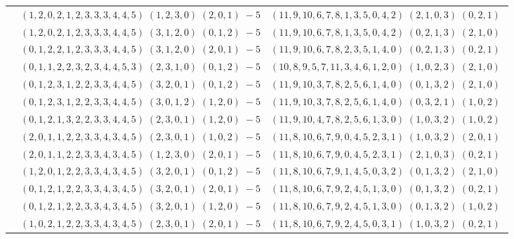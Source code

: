 \documentclass[11pt]{article}
\begin{document}
\begin{longtable}[l]{|c|c|c|}
 \cline{2-3} 
 & $(1 ,2 ,0 ,2 ,1 ,2 ,3 ,3 ,3 ,4 ,4 ,5) \;(1 ,2 ,3 ,0) \;(2 ,0 ,1) \;-5$ & $(11 ,9 ,10 ,6 ,7 ,8 ,1 ,3 ,5 ,0 ,4 ,2) \;(2 ,1 ,0 ,3) \;(0 ,2 ,1) \;$\\ 
 \cline{2-3} 
 & $(1 ,2 ,0 ,2 ,1 ,2 ,3 ,3 ,3 ,4 ,4 ,5) \;(3 ,1 ,2 ,0) \;(0 ,1 ,2) \;-5$ & $(11 ,9 ,10 ,6 ,7 ,8 ,1 ,3 ,5 ,0 ,4 ,2) \;(0 ,2 ,1 ,3) \;(2 ,1 ,0) \;$\\ 
 \cline{2-3} 
 & $(0 ,1 ,2 ,2 ,1 ,2 ,3 ,3 ,3 ,4 ,4 ,5) \;(3 ,1 ,2 ,0) \;(2 ,0 ,1) \;-5$ & $(11 ,9 ,10 ,6 ,7 ,8 ,2 ,3 ,5 ,1 ,4 ,0) \;(0 ,2 ,1 ,3) \;(0 ,2 ,1) \;$\\ 
 \cline{2-3} 
 & $(0 ,1 ,1 ,2 ,2 ,3 ,2 ,3 ,4 ,4 ,5 ,3) \;(2 ,3 ,1 ,0) \;(0 ,1 ,2) \;-5$ & $(10 ,8 ,9 ,5 ,7 ,11 ,3 ,4 ,6 ,1 ,2 ,0) \;(1 ,0 ,2 ,3) \;(2 ,1 ,0) \;$\\ 
 \cline{2-3} 
 & $(0 ,1 ,2 ,3 ,1 ,2 ,2 ,3 ,3 ,4 ,4 ,5) \;(3 ,2 ,0 ,1) \;(0 ,1 ,2) \;-5$ & $(11 ,9 ,10 ,3 ,7 ,8 ,2 ,5 ,6 ,1 ,4 ,0) \;(0 ,1 ,3 ,2) \;(2 ,1 ,0) \;$\\ 
 \cline{2-3} 
 & $(0 ,1 ,2 ,3 ,1 ,2 ,2 ,3 ,3 ,4 ,4 ,5) \;(3 ,0 ,1 ,2) \;(1 ,2 ,0) \;-5$ & $(11 ,9 ,10 ,3 ,7 ,8 ,2 ,5 ,6 ,1 ,4 ,0) \;(0 ,3 ,2 ,1) \;(1 ,0 ,2) \;$\\ 
 \cline{2-3} 
 & $(0 ,1 ,2 ,1 ,3 ,2 ,2 ,3 ,3 ,4 ,4 ,5) \;(2 ,3 ,0 ,1) \;(1 ,2 ,0) \;-5$ & $(11 ,9 ,10 ,4 ,7 ,8 ,2 ,5 ,6 ,1 ,3 ,0) \;(1 ,0 ,3 ,2) \;(1 ,0 ,2) \;$\\ 
 \cline{2-3} 
 & $(2 ,0 ,1 ,1 ,2 ,2 ,3 ,3 ,4 ,3 ,4 ,5) \;(2 ,3 ,0 ,1) \;(1 ,0 ,2) \;-5$ & $(11 ,8 ,10 ,6 ,7 ,9 ,0 ,4 ,5 ,2 ,3 ,1) \;(1 ,0 ,3 ,2) \;(2 ,0 ,1) \;$\\ 
 \cline{2-3} 
 & $(2 ,0 ,1 ,1 ,2 ,2 ,3 ,3 ,4 ,3 ,4 ,5) \;(1 ,2 ,3 ,0) \;(2 ,0 ,1) \;-5$ & $(11 ,8 ,10 ,6 ,7 ,9 ,0 ,4 ,5 ,2 ,3 ,1) \;(2 ,1 ,0 ,3) \;(0 ,2 ,1) \;$\\ 
 \cline{2-3} 
 & $(1 ,2 ,0 ,1 ,2 ,2 ,3 ,3 ,4 ,3 ,4 ,5) \;(3 ,2 ,0 ,1) \;(0 ,1 ,2) \;-5$ & $(11 ,8 ,10 ,6 ,7 ,9 ,1 ,4 ,5 ,0 ,3 ,2) \;(0 ,1 ,3 ,2) \;(2 ,1 ,0) \;$\\ 
 \cline{2-3} 
 & $(0 ,1 ,2 ,1 ,2 ,2 ,3 ,3 ,4 ,3 ,4 ,5) \;(3 ,2 ,0 ,1) \;(2 ,0 ,1) \;-5$ & $(11 ,8 ,10 ,6 ,7 ,9 ,2 ,4 ,5 ,1 ,3 ,0) \;(0 ,1 ,3 ,2) \;(0 ,2 ,1) \;$\\ 
 \cline{2-3} 
 & $(0 ,1 ,2 ,1 ,2 ,2 ,3 ,3 ,4 ,3 ,4 ,5) \;(3 ,2 ,0 ,1) \;(1 ,2 ,0) \;-5$ & $(11 ,8 ,10 ,6 ,7 ,9 ,2 ,4 ,5 ,1 ,3 ,0) \;(0 ,1 ,3 ,2) \;(1 ,0 ,2) \;$\\ 
 \cline{2-3} 
 & $(1 ,0 ,2 ,1 ,2 ,2 ,3 ,3 ,4 ,3 ,4 ,5) \;(2 ,3 ,0 ,1) \;(2 ,0 ,1) \;-5$ & $(11 ,8 ,10 ,6 ,7 ,9 ,2 ,4 ,5 ,0 ,3 ,1) \;(1 ,0 ,3 ,2) \;(0 ,2 ,1) \;$\\ 

\end{longtable}
\end{document}

